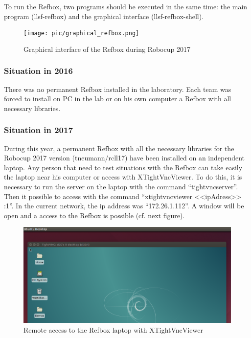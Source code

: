 To run the Refbox, two programs should be executed in the same time: the main program (llsf-refbox) and the graphical interface (llsf-refbox-shell).

\begin{figure}[!h]
\centering
\texttt{[image: pic/graphical\_refbox.png]}
\caption{Graphical interface of the Refbox during Robocup 2017}
\label{fig:graphicalRefbox}
\end{figure}

\subsubsection{Situation in 2016}

There was no permanent Refbox installed in the laboratory. Each team was forced to install on PC in the lab or on his own computer a Refbox with all necessary libraries. \\


\subsubsection{Situation in 2017}

During this year, a permanent Refbox with all the necessary libraries for the Robocup 2017 version (tneumann/rcll17) have been installed on an independent laptop. Any person that need to test situations with the Refbox can take easily the laptop near his computer or access with XTightVncViewer.  To do this, it is necessary to run the server on the laptop with the command “tightvncserver”. Then it possible to access with the command “xtightvncviewer <<ipAdress>> :1”.  In the current network, the ip address was “172.26.1.112”.
A window will be open and a access to the Refbox is possible (cf. next figure).\\

\begin{figure}[!h]
\centering
\includegraphics[width=\linewidth]{pic/xtightvncviewer.png}
\caption{Remote access to the Refbox laptop with XTightVncViewer}
\label{fig:xtightvncviewer}
\end{figure}

